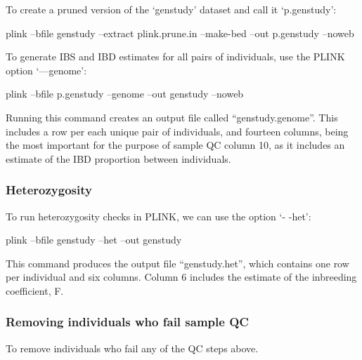 \documentclass[]{book}
\newenvironment{Shaded}{\begin{snugshade}}{\end{snugshade}}
\newcommand{\ExtensionTok}[1]{#1}
\newcommand{\NormalTok}[1]{#1}
\begin{document}
To create a pruned version of the `genstudy' dataset and call it
`p.genstudy':

\begin{Shaded}
\begin{Highlighting}[]
\ExtensionTok{plink}\NormalTok{ --bfile genstudy --extract plink.prune.in --make-bed --out p.genstudy --noweb}
\end{Highlighting}
\end{Shaded}

To generate IBS and IBD estimates for all pairs of individuals, use the
PLINK option `---genome':

\begin{Shaded}
\begin{Highlighting}[]
\ExtensionTok{plink}\NormalTok{ --bfile p.genstudy --genome --out genstudy --noweb}
\end{Highlighting}
\end{Shaded}

Running this command creates an output file called ``genstudy.genome''.
This includes a row per each unique pair of individuals, and fourteen
columns, being the most important for the purpose of sample QC column
10, as it includes an estimate of the IBD proportion between
individuals.

\subsubsection{Heterozygosity}\label{heterozygosity}

To run heterozygosity checks in PLINK, we can use the option `- -het':

\begin{Shaded}
\begin{Highlighting}[]
\ExtensionTok{plink}\NormalTok{ --bfile genstudy --het --out genstudy}
\end{Highlighting}
\end{Shaded}

This command produces the output file ``genstudy.het'', which contains
one row per individual and six columns. Column 6 includes the estimate
of the inbreeding coefficient, F.

\subsubsection{Removing individuals who fail sample
QC}\label{removing-individuals-who-fail-sample-qc}

To remove individuals who fail any of the QC steps above.
\end{document}
